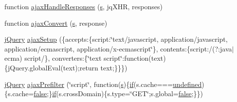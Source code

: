 \begin{DoxyCompactItemize}
\item 
function \hyperlink{jquery-1_89_81_8js_a71c2db7846f21963cee426cb81003c63}{ajax\+Handle\+Responses} (\hyperlink{validate_8js_ae059f217efaf1d50696a1214c3ce5748}{s}, jq\+X\+H\+R, responses)
\item 
function \hyperlink{jquery-1_89_81_8js_ad8bc8d3f922c608661a3113cfef57dbe}{ajax\+Convert} (\hyperlink{validate_8js_ae059f217efaf1d50696a1214c3ce5748}{s}, response)
\item 
\hyperlink{_site_bundle_2_resources_2public_2js_2_specific_functions_8js_ada154f66b5b2b806f5e239376e925644}{j\+Query} \hyperlink{jquery-1_89_81_8js_a52a40924d02e0d9756f051e36a640cd6}{ajax\+Setup} (\{accepts\+:\{script\+:\char`\"{}text/javascript, application/javascript, application/ecmascript, application/x-\/ecmascript\char`\"{}\}, contents\+:\{script\+:/(?\+:java$\vert$ecma) script/\}, converters\+:\{\char`\"{}text script\char`\"{}\+:function(text)\{j\+Query.\+global\+Eval(text);return text;\}\}\})
\item 
\hyperlink{_site_bundle_2_resources_2public_2js_2_specific_functions_8js_ada154f66b5b2b806f5e239376e925644}{j\+Query} \hyperlink{jquery-1_89_81_8js_a144939e373cc1ad511a53c4251ec7ffa}{ajax\+Prefilter} (\char`\"{}script\char`\"{}, function(\hyperlink{validate_8js_ae059f217efaf1d50696a1214c3ce5748}{s})\{\hyperlink{fullpage_2plugin_8js_a8b98017e64ef036adb9ae327ff94abe1}{if}(s.\+cache===\hyperlink{tinymce_8js_a08113a236cc18d2a9d5ce27e638012be}{undefined})\{s.\+cache=\hyperlink{validate_8js_a5df37b7f02e5cdc7d9412b7f872b8e01}{false};\}\hyperlink{fullpage_2plugin_8js_a8b98017e64ef036adb9ae327ff94abe1}{if}(s.\+cross\+Domain)\{s.\+type=\char`\"{}G\+E\+T\char`\"{};s.\+global=\hyperlink{validate_8js_a5df37b7f02e5cdc7d9412b7f872b8e01}{false};\}\})
\item 

\end{DoxyCompactItemize}
